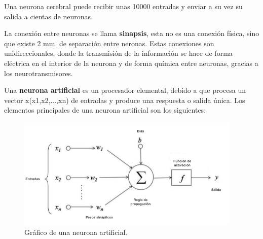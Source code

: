 Una neurona cerebral puede recibir unas 10000 entradas y enviar a su vez su salida a cientas de neuronas.

\vspace{5mm} %

La conexi\'{o}n entre neuronas se llama \textbf{sinapsis}, esta no es una conexi\'{o}n f\'{i}sica, sino que existe 2 mm. de separaci\'{o}n entre neronas. Estas conexiones son unidireccionales, donde la transmisi\'{o}n de la informaci\'{o}n se hace de forma el\'{e}ctrica en el interior de la neurona  y de forma qu\'{i}mica entre neuronas, gracias a los neurotransmisores.

Una \textbf{neurona artificial} es un procesador elemental, debido a que procesa un vector x(x1,x2,...,xn) de entradas y produce una respuesta o salida \'{u}nica. Los elementos principales de una neurona artificial son los siguientes:

\begin{figure}[h!]
  \begin{center}	\includegraphics[width=0.95\textwidth]{imagenes/Cap4/neurona_artificial}
  \caption{Gr\'{a}fico de una neurona artificial.}
  \label{fig:neurona}
  \end{center}
\end{figure}

